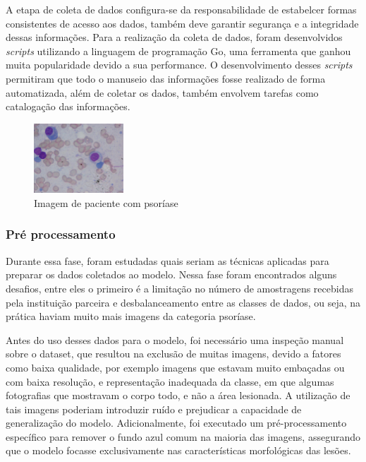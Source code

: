 A etapa de coleta de dados configura-se da responsabilidade de estabelcer formas consistentes de acesso aos dados, também deve garantir segurança e a integridade dessas informações. Para a realização da coleta de dados, foram desenvolvidos \textit{scripts} utilizando a linguagem de programação Go, uma ferramenta que ganhou muita popularidade devido a sua performance. O desenvolvimento desses \textit{scripts} permitiram que todo o manuseio das informações fosse realizado de forma automatizada, além de coletar os dados, também envolvem tarefas como catalogação das informações.


\begin{figure}[h] %
    \centering
    \includegraphics[width=0.3\textwidth]{images/datasetexample.jpg}
    \caption{Imagem de paciente com psoríase}
    \label{fig:ex-dataset}
\end{figure}

\subsubsection{Pré processamento}

Durante essa fase, foram estudadas quais seriam as técnicas aplicadas para preparar os dados coletados ao modelo. Nessa fase foram encontrados alguns desafios, entre eles o primeiro é a limitação no número de amostragens recebidas pela instituição parceira e desbalanceamento entre as classes de dados, ou seja, na prática haviam muito mais imagens da categoria psoríase.

Antes do uso desses dados para o modelo, foi necessário uma inspeção manual sobre o dataset, que resultou na exclusão de muitas imagens, devido a fatores como baixa qualidade, por exemplo imagens que estavam muito embaçadas ou com baixa resolução, e representação inadequada da classe, em que algumas fotografias que mostravam o corpo todo, e não a área lesionada. A utilização de tais imagens poderiam introduzir ruído e prejudicar a capacidade de generalização do modelo. Adicionalmente, foi executado um pré-processamento específico para remover o fundo azul comum na maioria das imagens, assegurando que o modelo focasse exclusivamente nas características morfológicas das lesões.

